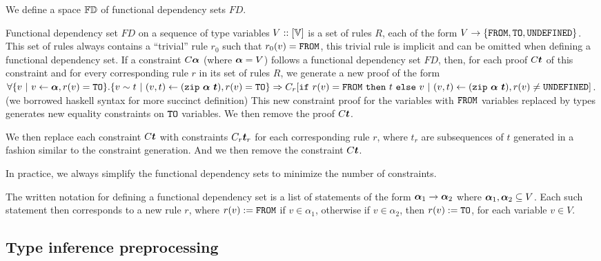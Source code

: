 \begin{defn}
    We define a space $\mathbb{FD}$ of functional dependency sets $FD$.

    Functional dependency set $FD$ on a sequence of type variables $V :: [\mathbb{V}]$ is a set of rules $R$, each of the form $V \to \{\mathtt{FROM}, \mathtt{TO}, \mathtt{UNDEFINED}\}$. This set of rules always contains a ``trivial'' rule $r_0$ such that $r_0(v) = \mathtt{FROM}$, this trivial rule is implicit and can be omitted when defining a functional dependency set. If a constraint $C \boldsymbol{\alpha}$ (where $\boldsymbol{\alpha} = V$) follows a functional dependency set $FD$, then, for each proof $C \boldsymbol{t}$ of this constraint and for every corresponding rule $r$ in its set of rules $R$, we generate a new proof of the form $\forall \{v \ |\  v \gets \boldsymbol{\alpha}, r(v) = \mathtt{TO}\} . \{v \sim t \ |\  (v, t) \gets (\mathtt{zip}\ \boldsymbol{\alpha}\ \boldsymbol{t}), r(v) = \mathtt{TO} \} \Rightarrow C_r [\mathtt{if}\ r(v) = \mathtt{FROM}\ \mathtt{then}\ t\ \mathtt{else}\ v \ |\  (v, t) \gets (\mathtt{zip}\ \boldsymbol{\alpha}\ \boldsymbol{t}), r(v) \neq \mathtt{UNDEFINED}]$. (we borrowed haskell syntax for more succinct definition) This new constraint proof for the variables with $\mathtt{FROM}$ variables replaced by types generates new equality constraints on $\mathtt{TO}$ variables. We then remove the proof $C \boldsymbol{t}$.

    We then replace each constraint $C \boldsymbol{t}$ with constraints $C_r \boldsymbol{t}_r$ for each corresponding rule $r$, where $t_r$ are subsequences of $t$ generated in a fashion similar to the constraint generation. And we then remove the constraint $C \boldsymbol{t}$.

    In practice, we always simplify the functional dependency sets to minimize the number of constraints. 

    The written notation for defining a functional dependency set is a list of statements of the form $\boldsymbol{\alpha}_1 \to \boldsymbol{\alpha}_2$ where $\boldsymbol{\alpha}_1, \boldsymbol{\alpha}_2 \subseteq V$. Each such statement then corresponds to a new rule $r$, where $r(v) := \mathtt{FROM}$ if $v \in \alpha_1$, otherwise if $v \in \alpha_2$, then $r(v) := \mathtt{TO}$, for each variable $v \in V$.
\end{defn}

\subsection{Type inference preprocessing}


